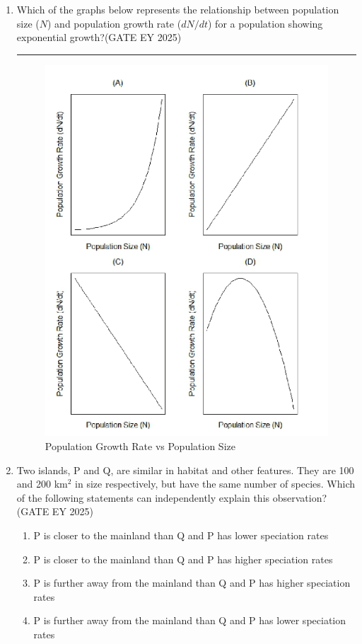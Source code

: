 \begin{enumerate}[leftmargin=*,label=\textbf{Q.\arabic*},resume]

\item Which of the graphs below represents the relationship between population size ($N$) and population growth rate ($dN/dt$) for a population showing exponential growth?\hfill {(GATE EY 2025)}

\rule{8cm}{0.15mm}

\begin{figure}[H]
    \centering
    \includegraphics[width=0.9\columnwidth]{figs/imageQ41.png}
    \caption{Population Growth Rate vs Population Size}
    \label{fig:q41-graph}
\end{figure}

\item Two islands, P and Q, are similar in habitat and other features. They are 100 and 200 km$^2$ in size respectively, but have the same number of species. Which of the following statements can independently explain this observation? \hfill {(GATE EY 2025)}
\begin{multicols}{2}
\begin{enumerate}
\item P is closer to the mainland than Q and P has lower speciation rates
\item P is closer to the mainland than Q and P has higher speciation rates
\item P is further away from the mainland than Q and P has higher speciation rates
\item P is further away from the mainland than Q and P has lower speciation rates
\end{enumerate}
\end{multicols}


\end{enumerate}

